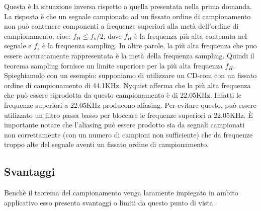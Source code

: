 \begin{enumerate}
        Questa è la situazione inversa rispetto a quella presentata nella prima
        domanda. La risposta è che un segnale campionato ad un fissato ordine
        di campionamento non può contenere componenti a frequenze superiori
        alla metà dell’ordine di campionamento, cioe: $f_H \leq f_s/2$, dove
        $f_H$ è la frequenza più alta contenuta nel segnale e $f_s$ è la frequenza
        sampling. In altre parole, la più alta frequenza che puo essere accuratamente
        rappresentata è la metà della frequenza sampling. Quindi il teorema
        sampling fornisce un limite superiore per la più alta frequenza $f_H$.
        Spieghiamolo con un esempio: supponiamo di utilizzare un CD-rom con un
        fissato ordine di campionamento di 44.1KHz. Nyquist afferma che la più
        alta frequenza che può essere riprodotta da questo campionamento è di
        22.05KHz. Infatti le frequenze superiori a 22.05KHz producono aliasing.
        Per evitare questo, può essere utilizzato un filtro passa basso per bloccare
        le frequenze superiori a 22.05KHz. È importante notare che l’aliasing
        può essere prodotto sia da segnali campionati non correttamente (con
        un numero di campioni non sufficiente) che da frequenze troppo alte del
        segnale aventi un fissato ordine di campionamento.
\end{enumerate}

\subsection{Svantaggi}

Benchè il teorema del campionamento venga laramente impiegato in ambito applicativo
esso presenta svantaggi o limiti da questo punto di vista.

